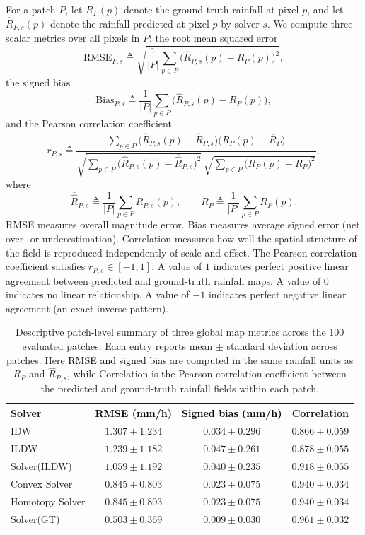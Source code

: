 \documentclass[11pt]{article}
\begin{document}
For a patch $P$, let $R_P(p)$ denote the ground-truth rainfall at pixel $p$, and let $\widehat{R}_{P,s}(p)$ denote the rainfall predicted at pixel $p$ by solver $s$. We compute three scalar metrics over all pixels in $P$: the root mean squared error
\[
\mathrm{RMSE}_{P,s}\triangleq
\sqrt{\frac{1}{|P|}\sum_{p\in P}\bigl(\widehat{R}_{P,s}(p)-R_P(p)\bigr)^2},
\]
the signed bias
\[
\mathrm{Bias}_{P,s}\triangleq
\frac{1}{|P|}\sum_{p\in P}\bigl(\widehat{R}_{P,s}(p)-R_P(p)\bigr),
\]
and the Pearson correlation coefficient
\[
r_{P,s}\triangleq
\frac{\sum_{p\in P}\bigl(\widehat{R}_{P,s}(p)-\overline{\widehat{R}}_{P,s}\bigr)\bigl(R_P(p)-\overline{R}_P\bigr)}
{\sqrt{\sum_{p\in P}\bigl(\widehat{R}_{P,s}(p)-\overline{\widehat{R}}_{P,s}\bigr)^2}\,
\sqrt{\sum_{p\in P}\bigl(R_P(p)-\overline{R}_P\bigr)^2}},
\]
where
\[
\overline{\widehat{R}}_{P,s}\triangleq \frac{1}{|P|}\sum_{p\in P}\widehat{R}_{P,s}(p),
\qquad
\overline{R}_P\triangleq \frac{1}{|P|}\sum_{p\in P}R_P(p).
\]
RMSE measures overall magnitude error.
Bias measures average signed error (net over- or underestimation).
Correlation measures how well the spatial structure of the field is reproduced
independently of scale and offset.
The Pearson correlation coefficient satisfies $r_{P,s}\in[-1,1]$.
A value of $1$ indicates perfect positive linear agreement between predicted and
ground-truth rainfall maps.
A value of $0$ indicates no linear relationship.
A value of $-1$ indicates perfect negative linear agreement (an exact inverse
pattern).

\begin{table}[H]
  \centering
  \begin{tabular}{lccc}
    \toprule
    Solver & \textcolor{black}{RMSE (mm/h)} & \textcolor{black}{Signed bias (mm/h)} & Correlation \\
    \midrule
    IDW & $1.307 \pm 1.234$ & $0.034 \pm 0.296$ & $0.866 \pm 0.059$ \\
    ILDW & $1.239 \pm 1.182$ & $0.047 \pm 0.261$ & $0.878 \pm 0.055$ \\
    Solver(ILDW) & $1.059 \pm 1.192$ & $0.040 \pm 0.235$ & $0.918 \pm 0.055$ \\
    Convex Solver & $0.845 \pm 0.803$ & $0.023 \pm 0.075$ & $0.940 \pm 0.034$ \\
    Homotopy Solver & $0.845 \pm 0.803$ & $0.023 \pm 0.075$ & $0.940 \pm 0.034$ \\
    Solver(GT) & $0.503 \pm 0.369$ & $0.009 \pm 0.030$ & $0.961 \pm 0.032$ \\
    \bottomrule
  \end{tabular}
  \caption{Descriptive patch-level summary of three global map metrics across the 100 evaluated patches. Each entry reports mean $\pm$ standard deviation across patches. Here \textcolor{black}{RMSE and signed bias} are computed in the same rainfall units as $R_P$ and $\widehat{R}_{P,s}$, while Correlation is the Pearson correlation coefficient between the predicted and ground-truth rainfall fields within each patch.}
  \label{tab:patch_map_metrics}
\end{table}
\end{document}
